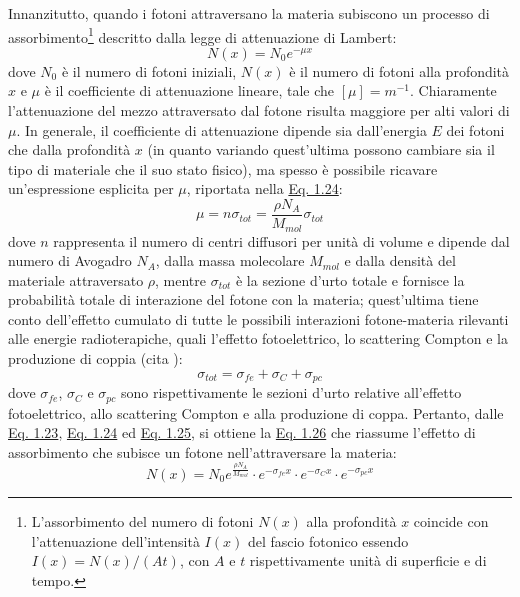 \documentclass[12pt,a4paper,twoside]{report}
\begin{document}
	Innanzitutto, quando i fotoni attraversano la materia subiscono un processo di assorbimento\footnote{L'assorbimento del numero di fotoni $N(x)$ alla profondità $x$ coincide con l'attenuazione dell'intensità $I(x)$ del fascio fotonico essendo $I(x)=N(x)/(At)$, con $A$ e $t$ rispettivamente unità di superficie e di tempo.} descritto dalla legge di attenuazione di Lambert:
	\begin{equation}
		N(x)=N_0e^{-\mu x}
		\label{eq:lambert}
	\end{equation}
	dove $N_0$ è il numero di fotoni iniziali, $N(x)$ è il numero di fotoni alla profondità $x$ e $\mu$ è il coefficiente di attenuazione lineare, tale che $\left[\mu\right]=m^{-1}$. Chiaramente l'attenuazione del mezzo attraversato dal fotone risulta maggiore per alti valori di $\mu$. In generale, il coefficiente di attenuazione dipende sia dall'energia $E$ dei fotoni che dalla profondità $x$ (in quanto variando quest'ultima possono cambiare sia il tipo di materiale che il suo stato fisico), ma spesso è possibile ricavare un'espressione esplicita per $\mu$, riportata nella \hyperref[eq:attenuazione]{Eq. 1.24}:
	\begin{equation}
		\mu=n\sigma_{tot}=\frac{\rho N_A}{M_{mol}}\sigma_{tot}
		\label{eq:attenuazione}
	\end{equation}
	dove $n$ rappresenta il numero di centri diffusori per unità di volume e dipende dal numero di Avogadro $N_A$, dalla massa molecolare $M_{mol}$ e dalla densità del materiale attraversato $\rho$, mentre $\sigma_{tot}$ è la sezione d'urto totale e fornisce la probabilità totale di interazione del fotone con la materia; quest'ultima tiene conto dell'effetto cumulato di tutte le possibili interazioni fotone-materia rilevanti alle energie radioterapiche, quali l'effetto fotoelettrico, lo scattering Compton e la produzione di coppia (cita
	):
	\begin{equation}
		\sigma_{tot}=\sigma_{fe}+\sigma_{C}+\sigma_{pc}
		\label{eq:sum_cross_section}
	\end{equation}
	dove $\sigma_{fe}$, $\sigma_{C}$ e $\sigma_{pc}$ sono rispettivamente le sezioni d'urto relative all'effetto fotoelettrico, allo scattering Compton e alla produzione di coppa. Pertanto, dalle \hyperref[eq:lambert]{Eq. 1.23}, \hyperref[eq:attenuazione]{Eq. 1.24} ed \hyperref[eq:sum_cross_section]{Eq. 1.25}, si ottiene la \hyperref[eq:photon_absorption]{Eq. 1.26} che riassume l'effetto di assorbimento che subisce un fotone nell'attraversare la materia:
	\begin{equation}
		N(x)=N_0e^{\frac{\rho N_A}{M_{mol}}}\cdot e^{-\sigma_{fe}x}\cdot e^{-\sigma_{C}x}\cdot e^{-\sigma_{pc}x}
		\label{eq:photon_absorption}
	\end{equation}
	
\end{document}
